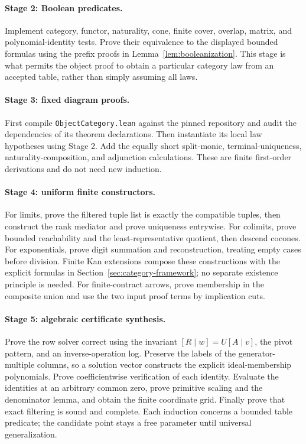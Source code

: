 \paragraph{Stage 2: Boolean predicates.}
Implement category, functor, naturality, cone, finite cover, overlap, matrix,
and polynomial-identity tests. Prove their equivalence to the displayed
bounded formulas using the prefix proofs in Lemma~\ref{lem:booleanization}.
This stage is what permits the object proof to obtain a particular category
law from an accepted table, rather than simply assuming all laws.

\paragraph{Stage 3: fixed diagram proofs.}
First compile \texttt{ObjectCategory.lean} against the pinned repository and
audit the dependencies of its theorem declarations. Then instantiate its
local law hypotheses using Stage 2. Add the equally short split-monic,
terminal-uniqueness, naturality-composition, and adjunction calculations.
These are finite first-order derivations and do not need new induction.

\paragraph{Stage 4: uniform finite constructors.}
For limits, prove the filtered tuple list is exactly the compatible tuples,
then construct the rank mediator and prove uniqueness entrywise. For colimits,
prove bounded reachability and the least-representative quotient, then descend
cocones. For exponentials, prove digit summation and reconstruction, treating
empty cases before division. Finite Kan extensions compose these constructions
with the explicit formulas in Section~\ref{sec:category-framework}; no separate
existence principle is needed. For finite-contract arrows, prove membership in
the composite union and use the two input proof terms by implication cuts.

\paragraph{Stage 5: algebraic certificate synthesis.}
Prove the row solver correct using the invariant
$[R\mid w]=U[A\mid v]$, the pivot pattern, and an inverse-operation log.
Preserve the labels of the generator-multiple columns, so a solution vector
constructs the explicit ideal-membership polynomials. Prove coefficientwise
verification of each identity. Evaluate the identities at an arbitrary common
zero, prove primitive scaling and the denominator lemma, and obtain the finite
coordinate grid. Finally prove that exact filtering is sound and complete.
Each induction concerns a bounded table predicate; the candidate point stays
a free parameter until universal generalization.

